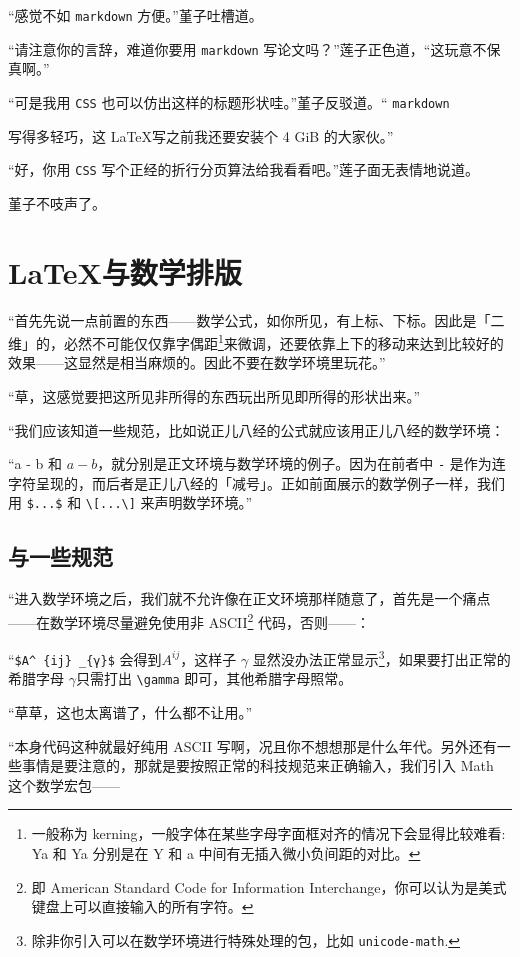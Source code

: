 “感觉不如 \verb"markdown"%
方便。”堇子吐槽道。

“请注意你的言辞，难道你要用 \verb"markdown" 写论文吗？”莲子正色道，“这玩意不保真啊。”

“可是我用 \verb"CSS" 也可以仿出这样的标题形状哇。”堇子反驳道。“ \verb"markdown"{%
写得多轻巧，这 \LaTeX 写之前我还要安装个 4 GiB 的大家伙。”

“好，你用 \verb"CSS" 写个正经的折行分页算法给我看看吧。”莲子面无表情地说道。

堇子不吱声了。



\section{\LaTeX 与数学排版}

“首先先说一点前置的东西——数学公式，如你所见，有上标、下标。因此是「二维」的，必然不可能仅仅靠字偶距\footnote{一般称为 kerning，一般字体在某些字母字面框对齐的情况下会显得比较难看: {Y}{a} 和 Ya 分别是在 Y 和 a 中间有无插入微小负间距的对比。}来微调，还要依靠上下的移动来达到比较好的效果——这显然是相当麻烦的。因此不要在数学环境里玩花。”

“草，这感觉要把这所见非所得的东西玩出所见即所得的形状出来。”

“我们应该知道一些规范，比如说正儿八经的公式就应该用正儿八经的数学环境：

“a - b 和 $a - b$，就分别是正文环境与数学环境的例子。因为在前者中 \verb"-" 是作为连字符呈现的，而后者是正儿八经的「减号」。正如前面展示的数学例子一样，我们用 \verb"$...$" 和 \verb"\[...\]" 来声明数学环境。”

\subsection{\AmS 与一些规范}

“进入数学环境之后，我们就不允许像在正文环境那样随意了，首先是一个痛点——在数学环境尽量避免使用非 ASCII\footnote{即
    American Standard Code for Information Interchange，你可以认为是美式键盘上可以直接输入的所有字符。} 代码，否则——：

“\verb"$A^ {ij} _{γ}$" 会得到$
    A^{ij} %
$，这样子 $\gamma $ 显然没办法正常显示\footnote{除非你引入可以在数学环境进行特殊处理的包，比如 \texttt{unicode-math}.}，如果要打出正常的希腊字母 $\gamma $只需打出 \verb"\gamma" 即可，其他希腊字母照常。

“草草，这也太离谱了，什么都不让用。”

“本身代码这种就最好纯用 ASCII 写啊，况且你不想想那是什么年代。另外还有一些事情是要注意的，那就是要按照正常的科技规范来正确输入，我们引入 \AmS{}Math 这个数学宏包——


}
